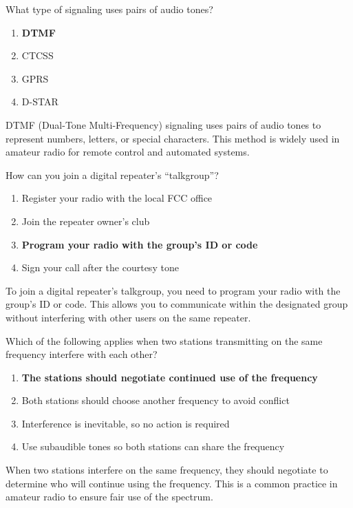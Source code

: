 \begin{tcolorbox}[colback=gray!10!white,colframe=black!75!black,title={T2B06}]
    What type of signaling uses pairs of audio tones?
    \begin{enumerate}[label=\Alph*,noitemsep]
        \item \textbf{DTMF}
        \item CTCSS
        \item GPRS
        \item D-STAR
    \end{enumerate}
\end{tcolorbox}
DTMF (Dual-Tone Multi-Frequency) signaling uses pairs of audio tones to represent numbers, letters, or special characters. This method is widely used in amateur radio for remote control and automated systems.


\begin{tcolorbox}[colback=gray!10!white,colframe=black!75!black,title={T2B07}]
    How can you join a digital repeater’s “talkgroup”?
    \begin{enumerate}[label=\Alph*,noitemsep]
        \item Register your radio with the local FCC office
        \item Join the repeater owner’s club
        \item \textbf{Program your radio with the group’s ID or code}
        \item Sign your call after the courtesy tone
    \end{enumerate}
\end{tcolorbox}
To join a digital repeater's talkgroup, you need to program your radio with the group's ID or code. This allows you to communicate within the designated group without interfering with other users on the same repeater.


\begin{tcolorbox}[colback=gray!10!white,colframe=black!75!black,title={T2B08}]
    Which of the following applies when two stations transmitting on the same frequency interfere with each other?
    \begin{enumerate}[label=\Alph*,noitemsep]
        \item \textbf{The stations should negotiate continued use of the frequency}
        \item Both stations should choose another frequency to avoid conflict
        \item Interference is inevitable, so no action is required
        \item Use subaudible tones so both stations can share the frequency
    \end{enumerate}
\end{tcolorbox}
When two stations interfere on the same frequency, they should negotiate to determine who will continue using the frequency. This is a common practice in amateur radio to ensure fair use of the spectrum.

